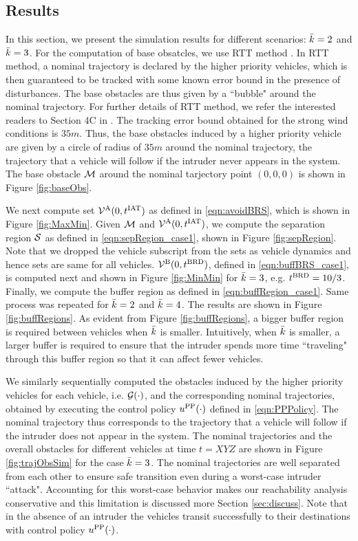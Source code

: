 \subsection{Results \label{sec:simResults}}
In this section, we present the simulation results for different scenarios: $\bar{k} = 2$ and $\bar{k} = 3$. For the computation of base obsatcles, we use RTT method \cite{Bansal2017}. In RTT method, a nominal trajectory is declared by the higher priority vehicles, which is then guaranteed to be tracked with some  known error bound in the presence of disturbances. The base obstacles are thus given by a ``bubble" around the nominal trajectory. For further details of RTT method, we refer the interested readers to Section 4C in \cite{Bansal2017}. The tracking error bound obtained for the strong wind conditions is $35m$. Thus, the base obstacles induced by a higher priority vehicle are given by a circle of radius of $35m$ around the nominal trajectory, the trajectory that a vehicle will follow if the intruder never appears in the system. The base obstacle $\mathcal{M}$ around the nominal tarjectory point $(0, 0, 0)$ is shown in Figure \ref{fig:baseObs}. 

We next compute set $\mathcal{V}^{\text{A}}(0, t^\text{IAT})$ as defined in \eqref{eqn:avoidBRS}, which is shown in Figure \ref{fig:MaxMin}. Given $\mathcal{M}$ and $\mathcal{V}^{\text{A}}(0, t^\text{IAT})$, we compute the separation region $\mathcal{S}$ as defined in \eqref{eqn:sepRegion_case1}, shown in Figure \ref{fig:sepRegion}. Note that we dropped the vehicle subscript from the sets as vehicle dynamics and hence sets are same for all vehicles. $\mathcal{V}^{\text{B}}(0, t^\text{BRD})$, defined in \eqref{eqn:buffBRS_case1}, is computed next and shown in Figure \ref{fig:MinMin} for $\bar{k} = 3$, e.g. $t^\text{BRD} = 10/3$. Finally, we compute the buffer region as defined in \eqref{eqn:buffRegion_case1}. Same process was repeated for $\bar{k} = 2$ and $\bar{k} = 4$. The results are shown in Figure \ref{fig:buffRegions}. As evident from Figure \ref{fig:buffRegions}, a bigger buffer region is required between vehicles when $\bar{k}$ is smaller. Intuitively, when $\bar{k}$ is smaller, a larger buffer is required to ensure that the intruder spends more time ``traveling" through this buffer region so that it can affect fewer vehicles.             

We similarly sequentially computed the obstacles induced by the higher priority vehicles for each vehicle, i.e. $\mathcal{G}(\cdot)$, and the corresponding nominal trajectories, obtained by executing the control policy $u^{\text{PP}}(\cdot)$ defined in \eqref{eqn:PPPolicy}. The nominal trajectory thus corresponds to the trajectory that a vehicle will follow if the intruder does not appear in the system. The nominal trajectories and the overall obstacles for different vehicles at time $t = XYZ$ are shown in Figure \ref{fig:trajObsSim} for the case $\bar{k} = 3$. The nominal trajectories are well separated from each other to ensure safe transition even during a worst-case intruder ``attack". Accounting for this worst-case behavior makes our reachability analysis  conservative and this limitation is discussed more Section \ref{sec:discuss}. Note that in the absence of an intruder the vehicles transit successfully to their destinations with control policy $u^{\text{PP}}(\cdot)$.

